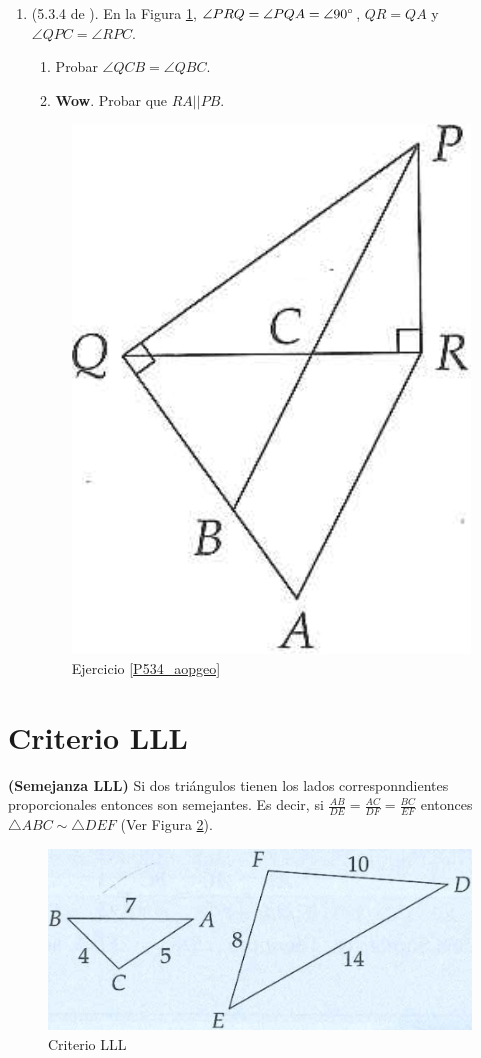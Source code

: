 \begin{enumerate}
	\item \label{P534_aopgeo} (5.3.4 de \cite{Aops_Geometria}). En la Figura \ref{534_aopgeo}, $\angle PRQ = \angle PQA = \angle 90\degree $, $QR=QA$ y $\angle QPC = \angle RPC$.
	\begin{enumerate}[label=\Alph*)]
			\item Probar $\angle QCB = \angle QBC$.
			\item \textbf{Wow}. Probar que $RA||PB$.
	\end{enumerate}
	
		\begin{figure}[H]
			\centering
			\includegraphics[width=0.25\linewidth]{Geometria/imgs/534_aopsgeo}
			\caption{Ejercicio \ref{P534_aopgeo} }
			\label{534_aopgeo}
		\end{figure}
	
	
\end{enumerate}
\newpage

\section{Criterio LLL}
\begin{theorem} \textbf{(Semejanza LLL)}
	Si dos triángulos tienen los lados corresponndientes proporcionales entonces son semejantes. Es decir, si $\frac{AB}{DE} = \frac{AC}{DF}= \frac{BC}{EF}$ entonces $\triangle ABC \sim \triangle DEF$ (Ver Figura \ref{aops_geo_criterio_LLL}).
	
	\begin{figure}[H]
		\centering
		\includegraphics[width=0.5\linewidth]{Geometria/imgs/aops_geo_criterio_LLL}
		\caption{Criterio LLL}
		\label{aops_geo_criterio_LLL}
	\end{figure}
\end{theorem}

